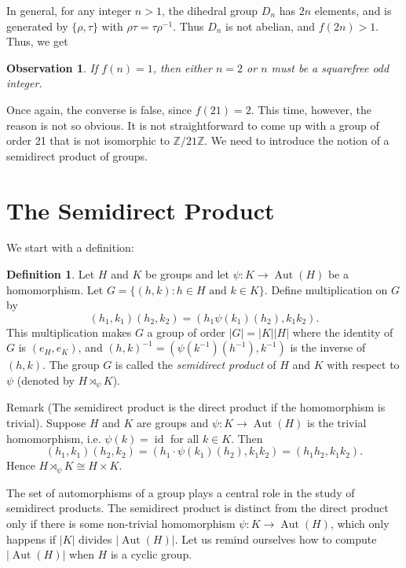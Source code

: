 \documentclass[12pt,reqno]{amsart}
\theoremstyle{plain}
\newtheorem{obs}[thm]{Observation}
\theoremstyle{definition}
\newtheorem*{defn}{Definition}
\numberwithin{equation}{section}
\begin{document}
In general, for any integer $n>1$, the dihedral group $D_n$ has $2n$ elements, and is generated by $\{\rho, \tau\}$ with $\rho\tau=\tau\rho^{-1}$. Thus $D_n$ is not abelian, and $f(2n)>1$. Thus, we get

\begin{obs}
If $f(n)=1$, then either $n=2$ or $n$ must be a squarefree odd integer.
\end{obs}

Once again, the converse is false, since $f(21)=2$. This time, however, the reason is not so obvious. It is not straightforward to come up with a group of order 21 that is not isomorphic to $\mathbb{Z}/21\mathbb{Z}$. We need to introduce the notion of a semidirect product of groups. 


\section{The Semidirect Product}
We start with a definition:
\begin{defn}
Let $H$ and $K$ be groups and let $\psi:K\rightarrow \operatorname{Aut}(H)$ be a homomorphism. Let $G=\{(h,k):h\in H \text{ and } k\in K\}$. Define multiplication on $G$ by
\[ (h_1,k_1)(h_2,k_2)=(h_1\psi(k_1)(h_2),k_1k_2). \]
This multiplication makes $G$ a group of order $|G|=|K||H|$ where the identity of $G$ is $(e_H,e_K)$, and $(h,k)^{-1}=(\psi(k^{-1})(h^{-1}),k^{-1})$ is the inverse of $(h, k)$. The group $G$ is called the \textit{semidirect product} of $H$ and $K$ with respect to $\psi$ (denoted by $H\rtimes_{\psi}K$).
\end{defn}

{\sc Remark} (The semidirect product is the direct product if the homomorphism is trivial). 
Suppose $H$ and $K$ are groups and $\psi:K\rightarrow \operatorname{Aut}(H)$ is the trivial homomorphism, i.e. $\psi(k)=\operatorname{id}$ for all $k\in K$. Then
\[ (h_1,k_1)(h_2,k_2)=(h_1\cdot\psi(k_1)(h_2),k_1k_2)=(h_1h_2,k_1k_2). \]
Hence $H\rtimes_{\psi}K\cong H\times K$.


The set of automorphisms of a group plays a central role in the study of semidirect products. The semidirect product is distinct from the direct product only if there is some non-trivial homomorphism $\psi:K\rightarrow \operatorname{Aut}(H)$, which only happens if $|K|$ divides $|\operatorname{Aut}(H)|$. Let us remind ourselves how to compute $|\operatorname{Aut}(H)|$ when $H$ is a cyclic group.
\end{document}

